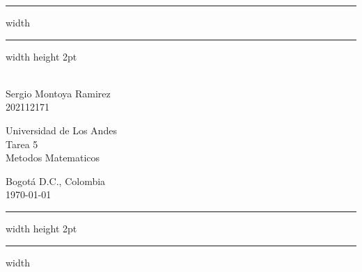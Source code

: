 \newenvironment{notes}
  {\begin{list}
     {{\fbseries Note \arabic{counter}.}}
    {\usecounter{counter}
     \setlength{\labelsep}{1em}
     \setlength{\itemsep}{2pt}
     \setlength{\leftmargin}{2em}
     \setlength{\rightmargin}{0cm}
     \setlength{\itemindent}{1em} }}
{\end{list}}

\vspace*{-1cm}
\hrule width \hsize \kern 1mm \hrule width \hsize height 2pt
\begin{center}
   \parbox[c]{.32\textwidth}{
   \hspace{1cm}\\
   Sergio Montoya Ramirez\\
   202112171}
   \hspace*{\fill}
   \parbox[c]{.35\textwidth}{\centering
   Universidad de Los Andes\\
   Tarea 5\\
   Metodos Matematicos\\
   }
   \hspace*{\fill}
   \parbox[c]{.3\textwidth}{
   \begin{flushleft}
      Bogotá D.C., Colombia\\
      \today
   \end{flushleft}}
\end{center}
\hrule width \hsize height 2pt \kern 1mm \hrule width \hsize

\bigskip

